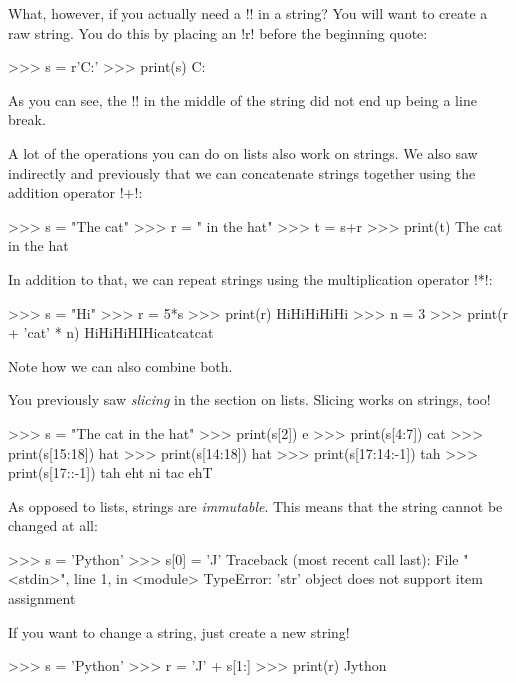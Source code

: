 \documentclass[11pt]{cselabheader}
\begin{document}
What, however, if you actually need a \pythoninline!\n! in a string? You will want
to create a raw string. You do this by placing an \pythoninline!r! before the
beginning quote:

\begin{pyconcode}
>>> s = r'C:\Users\Files\nothing\more'
>>> print(s)
C:\Users\Files\nothing\more
\end{pyconcode}

As you can see, the \pythoninline!\n! in the middle of the string did not end up
being a line break.

A lot of the operations you can do on lists also work on strings. We also saw
indirectly and previously that we can concatenate strings together using the
addition operator \pythoninline!+!:

\begin{pyconcode}
>>> s = "The cat"
>>> r = " in the hat"
>>> t = s+r
>>> print(t)
The cat in the hat
\end{pyconcode}

In addition to that, we can repeat strings using the multiplication operator
\pythoninline!*!:

\begin{pyconcode}
>>> s = "Hi"
>>> r = 5*s
>>> print(r)
HiHiHiHiHi
>>> n = 3
>>> print(r + 'cat' * n)
HiHiHiHIHicatcatcat
\end{pyconcode}

Note how we can also combine both.

You previously saw \emph{slicing} in the section on lists. Slicing works on strings, too!

\begin{pyconcode}
>>> s = "The cat in the hat"
>>> print(s[2])
e
>>> print(s[4:7])
cat
>>> print(s[15:18])
hat
>>> print(s[14:18])
 hat
>>> print(s[17:14:-1])
tah
>>> print(s[17::-1])
tah eht ni tac ehT
\end{pyconcode}

As opposed to lists, strings are \emph{immutable}. This means that the string
cannot be changed at all:

\begin{pyconcode}
>>> s = 'Python'
>>> s[0] = 'J'
Traceback (most recent call last):
  File "<stdin>", line 1, in <module>
TypeError: 'str' object does not support item assignment
\end{pyconcode}

If you want to change a string, just create a new string!

\begin{pyconcode}
>>> s = 'Python'
>>> r = 'J' + s[1:]
>>> print(r)
Jython
\end{pyconcode}
\end{document}
